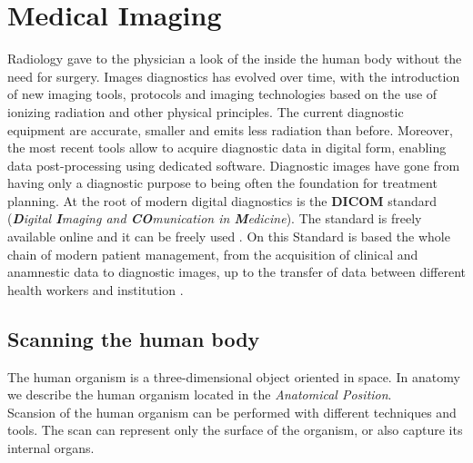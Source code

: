 
\chapter{ Medical Imaging} %

\label{Chapter2} %
 
Radiology gave to the physician a look of the inside the human body without the need for surgery. Images diagnostics has evolved over time, with the introduction of new imaging tools, protocols and imaging technologies based on the use of ionizing radiation and other physical principles. The current diagnostic equipment are accurate, smaller and emits less radiation than before. Moreover, the most recent tools allow to acquire diagnostic data in digital form, enabling data post-processing using dedicated software. Diagnostic images have gone from having only a diagnostic purpose to being often the foundation for treatment planning.
At the root of modern digital diagnostics is the \textbf{DICOM} standard (\emph{\textbf{D}igital \textbf{I}maging and \textbf{CO}munication in \textbf{M}edicine}). The standard is freely available online and it can be freely used \parencite{Reference27}. On this Standard is based the whole chain of modern patient management, from the acquisition of clinical and anamnestic data to diagnostic images, up to the transfer of data between different health workers and institution \parencite{Reference25}.

\section{Scanning the human body}
The human organism is a three-dimensional object oriented in space. In anatomy we describe the human organism located in the \emph{Anatomical Position}.\\
Scansion of the human organism can be performed with different techniques and tools. The scan can represent only the surface of the organism, or also capture its internal organs.

